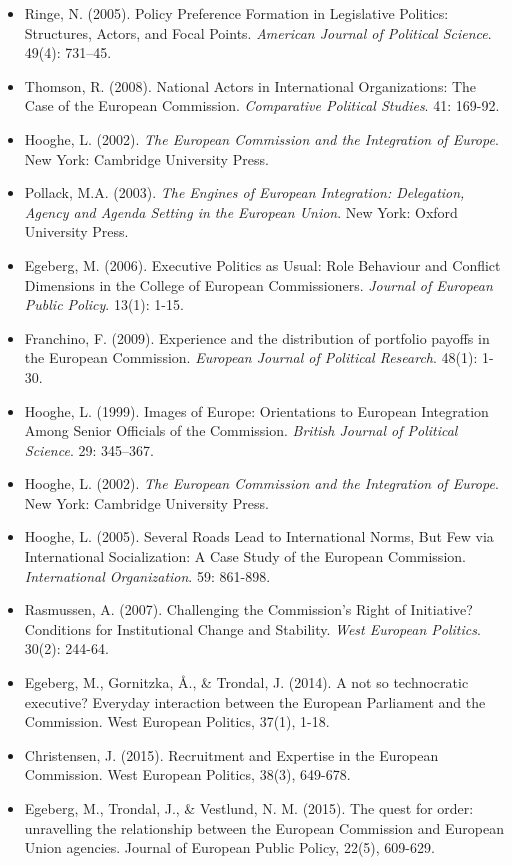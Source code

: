 \begin{itemize}
	\item Ringe, N. (2005). Policy Preference Formation in Legislative Politics: Structures, Actors, and Focal Points. \textit{American Journal of Political Science}. 49(4): 731–45.
	\item Thomson, R. (2008). National Actors in International Organizations: The Case of the European Commission. \textit{Comparative Political Studies}. 41: 169-92.
	\item Hooghe, L. (2002). \textit{The European Commission and the Integration of Europe}. New York: Cambridge University Press.
	\item Pollack, M.A. (2003). \textit{The Engines of European Integration: Delegation, Agency and Agenda Setting in the European Union}. New York: Oxford University Press.
	\item Egeberg, M. (2006). Executive Politics as Usual: Role Behaviour and Conflict Dimensions in the College of European Commissioners. \textit{Journal of European Public Policy}. 13(1): 1-15.
	\item Franchino, F. (2009). Experience and the distribution of portfolio payoffs in the European Commission. \textit{European Journal of Political Research}. 48(1): 1-30.
	\item Hooghe, L. (1999). Images of Europe: Orientations to European Integration Among Senior Officials of the Commission. \textit{British Journal of Political Science}. 29: 345–367.
	\item Hooghe, L. (2002). \textit{The European Commission and the Integration of Europe}. New York: Cambridge University Press. 
	\item Hooghe, L. (2005). Several Roads Lead to International Norms, But Few via International Socialization: A Case Study of the European Commission. \textit{International Organization}. 59: 861-898.
	\item Rasmussen, A. (2007). Challenging the Commission’s Right of Initiative? Conditions for Institutional Change and Stability. \textit{West European Politics}. 30(2): 244-64.
	\item Egeberg, M., Gornitzka, Å., \& Trondal, J. (2014). A not so technocratic executive? Everyday interaction between the European Parliament and the Commission. West European Politics, 37(1), 1-18.
	\item Christensen, J. (2015). Recruitment and Expertise in the European Commission. West European Politics, 38(3), 649-678.
	\item Egeberg, M., Trondal, J., \& Vestlund, N. M. (2015). The quest for order: unravelling the relationship between the European Commission and European Union agencies. Journal of European Public Policy, 22(5), 609-629.

\end{itemize}
